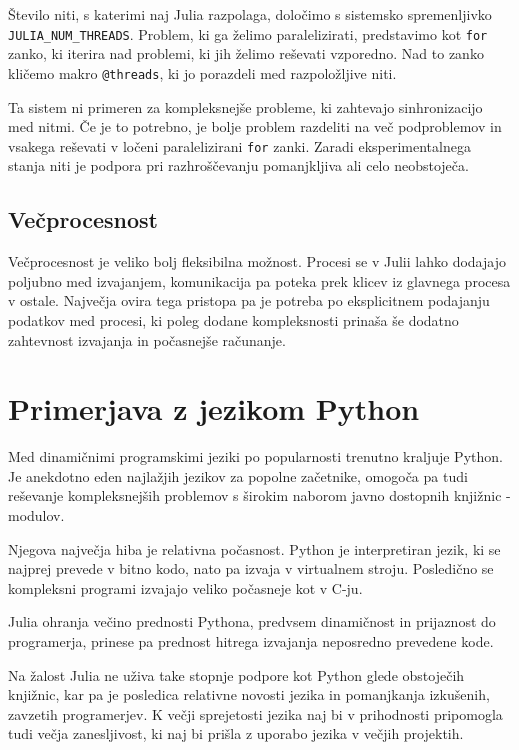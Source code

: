 \documentclass[journal,a4paper,twoside]{sty/IEEEtran}
\begin{document}
Število niti, s katerimi naj Julia razpolaga, določimo s sistemsko spremenljivko \texttt{JULIA\_NUM\_THREADS}.
Problem, ki ga želimo paralelizirati, predstavimo kot \texttt{for} zanko, ki iterira nad problemi, ki jih želimo reševati vzporedno.
Nad to zanko kličemo makro \texttt{@threads}, ki jo porazdeli med razpoložljive niti.

Ta sistem ni primeren za kompleksnejše probleme, ki zahtevajo sinhronizacijo med nitmi.
Če je to potrebno, je bolje problem razdeliti na več podproblemov in vsakega reševati v ločeni paralelizirani \texttt{for} zanki.
Zaradi eksperimentalnega stanja niti je podpora pri razhroščevanju pomanjkljiva ali celo neobstoječa.\cite{julia-thread-problems}

\subsection{Večprocesnost}

Večprocesnost je veliko bolj fleksibilna možnost.
Procesi se v Julii lahko dodajajo poljubno med izvajanjem, komunikacija pa poteka prek klicev iz glavnega procesa v ostale.
Največja ovira tega pristopa pa je potreba po eksplicitnem podajanju podatkov med procesi, ki poleg dodane kompleksnosti prinaša še dodatno zahtevnost
	izvajanja in počasnejše računanje.

\section{Primerjava z jezikom Python}

Med dinamičnimi programskimi jeziki po popularnosti trenutno kraljuje Python.\cite{python-tiobe}\cite{python-pypl}
Je anekdotno eden najlažjih jezikov za popolne začetnike, omogoča pa tudi reševanje kompleksnejših problemov s širokim naborom javno dostopnih knjižnic -
	modulov.\cite{python-pypi}

Njegova največja hiba je relativna počasnost.
Python je interpretiran jezik, ki se najprej prevede v bitno kodo, nato pa izvaja v virtualnem stroju.
Posledično se kompleksni programi izvajajo veliko počasneje kot v C-ju.

Julia ohranja večino prednosti Pythona, predvsem dinamičnost in prijaznost do programerja, prinese pa prednost hitrega izvajanja neposredno prevedene
	kode.

Na žalost Julia ne uživa take stopnje podpore kot Python glede obstoječih knjižnic, kar pa je posledica relativne novosti jezika in pomanjkanja izkušenih,
	zavzetih programerjev.
K večji sprejetosti jezika naj bi v prihodnosti pripomogla tudi večja zanesljivost, ki naj bi prišla z uporabo jezika v večjih projektih.
\end{document}
